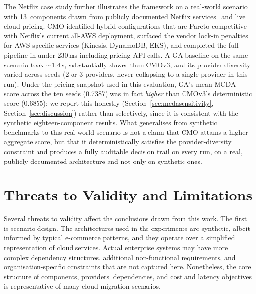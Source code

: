 \documentclass[journal]{IEEEtran}
\newcommand{\cmo}{CMO\xspace}
\newcommand{\cmothree}{CMOv3\xspace}
\begin{document}
The Netflix case study further illustrates the framework on a real-world
scenario with 13~components drawn from publicly documented Netflix
services~\cite{aws_netflix,netflix_zuul,netflix_atlas,netflix_titus,netflix_openconnect}
and live cloud pricing. \cmo identified hybrid configurations that are
Pareto-competitive with Netflix's current all-AWS deployment, surfaced the
vendor lock-in penalties for AWS-specific services (Kinesis, DynamoDB, EKS),
and completed the full pipeline in under 230\,ms including pricing API calls.
A GA baseline on the same scenario took ${\sim}$1.4\,s, substantially slower
than \cmothree, and its provider diversity varied across seeds (2 or 3
providers, never collapsing to a single provider in this run). Under the
pricing snapshot used in this evaluation, GA's mean MCDA score across the ten
seeds (0.7387) was in fact \emph{higher} than \cmothree's deterministic score
(0.6855); we report this honestly (Section~\ref{sec:mcdasensitivity},
Section~\ref{sec:discussion}) rather than selectively, since it is consistent
with the synthetic eighteen-component results. What generalises from
synthetic benchmarks to this real-world scenario is not a claim that \cmo
attains a higher aggregate score, but that it deterministically satisfies the
provider-diversity constraint and produces a fully auditable decision trail
on every run, on a real, publicly documented architecture and not only on
synthetic ones.

\section{Threats to Validity and Limitations}
\label{sec:threats}

Several threats to validity affect the conclusions drawn from this work. The
first is scenario design. The architectures used in the experiments are
synthetic, albeit informed by typical e-commerce patterns, and they operate over
a simplified representation of cloud services. Actual enterprise systems may
have more complex dependency structures, additional non-functional requirements,
and organisation-specific constraints that are not captured here. Nonetheless,
the core structure of components, providers, dependencies, and cost and latency
objectives is representative of many cloud migration scenarios.
\end{document}
